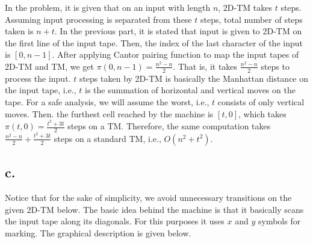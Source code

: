 \documentclass[12pt]{article}
\begin{document}
In the problem, it is given that on an input with length $n$, 2D-TM takes $t$ steps. Assuming input processing is separated from these $t$ steps, total number of steps taken is $n + t$. In the previous part, it is stated that input is given to 2D-TM on the first line of the input tape. Then, the index of the last character of the input is $[0, n - 1]$. After applying Cantor pairing function to map the input tapes of 2D-TM and TM, we get $\pi(0, n - 1) = \frac{n^2 - n}{2}$. That is, it takes $\frac{n^2 - n}{2}$ steps to process the input. $t$ steps taken by 2D-TM is basically the Manhattan distance on the input tape, i.e., $t$ is the summation of horizontal and vertical moves on the tape. For a safe analysis, we will assume the worst, i.e., $t$ consists of only vertical moves. Then. the furthest cell reached by the machine is $[t, 0]$, which takes $\pi(t, 0) = \frac{t^2+3t}{2}$ steps on a TM. Therefore, the same computation takes $\frac{n^2 - n}{2} + \frac{t^2+3t}{2}$ steps on a standard TM, i.e., $O(n^2 + t^2)$.

\subsection*{c.} 

Notice that for the sake of simplicity, we avoid unnecessary transitions on the given 2D-TM below. The basic idea behind the machine is that it basically scans the input tape along its diagonals. For this purposes it uses $x$ and $y$ symbols for marking. The graphical description is given below.
\end{document}
